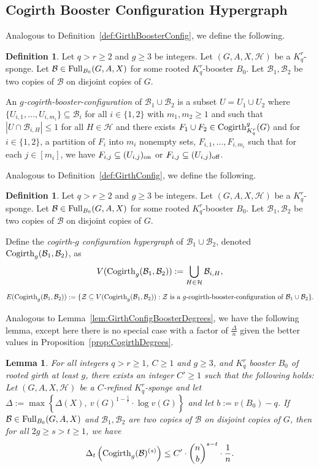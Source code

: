\documentclass[11pt]{article}
\newcommand{\mc}[1]{\mathcal{#1}}
\newcounter{i}
\theoremstyle{plain}
\newtheorem{lem}[thm]{Lemma}
\theoremstyle{plain} %
\theoremstyle{definition}
\newtheorem{definition}[thm]{Definition}
\begin{document}
\subsection{Cogirth Booster Configuration Hypergraph}

Analogous to Definition~\ref{def:GirthBoosterConfig}, we define the following. 

\begin{definition}
Let $q>r\ge 2$ and $g\ge 3$ be integers. Let $(G,A,X,\mc{H})$ be a $K_q^r$-sponge. Let $\mc{B} \in {\rm Full}_{B_0}(G,A,X)$ for some rooted $K_q^r$-booster $B_0$. Let $\mc{B}_1, \mc{B}_2$ be two copies of $\mc{B}$ on disjoint copies of $G$.

An \emph{$g$-cogirth-booster-configuration} of $\mc{B}_1\cup \mc{B}_2$ is a subset $U =U_1\cup U_2$ where $\{U_{i,1},\ldots,U_{i,m_i}\}\subseteq \mc{B}_i$ for all $i\in \{1,2\}$ with $m_1,m_2\ge 1$ and such that $|U\cap \mc{B}_{i,H}|\le 1$ for all $H\in \mc{H}$ and there exists $F_1\cup F_2\in {\rm Cogirth}_{K_q^r}^g(G)$ and for $i\in \{1,2\}$, a partition of $F_i$ into $m_i$ nonempty sets, $F_{i,1},\ldots, F_{i,m_i}$ such that for each $j\in [m_i]$, we have $F_{i,j}\subseteq (U_{i,j})_{\rm on}$ or $F_{i,j}\subseteq (U_{i,j})_{\rm off}$.
\end{definition}

Analogous to Definition~\ref{def:GirthConfig}, we define the following. 

\begin{definition}
Let $q>r\ge 2$ and $g\ge 3$ be integers. Let $(G,A,X,\mc{H})$ be a $K_q^r$-sponge. Let $\mc{B} \in {\rm Full}_{B_0}(G,A,X)$ for some rooted $K_q^r$-booster $B_0$. Let $\mc{B}_1,\mc{B}_2$ be two copies of $\mc{B}$ on disjoint copies of $G$.

Define the \emph{cogirth-$g$ configuration hypergraph} of $\mc{B}_1\cup  \mc{B}_2$, denoted ${\rm Cogirth}_g(\mc{B}_1,\mc{B}_2)$, as
$$V({\rm Cogirth}_g(\mc{B}_1,\mc{B}_2)) := \bigcup_{H\in \mc{H}} \mc{B}_{i,H},$$
$$E({\rm Cogirth}_g(\mc{B}_1,\mc{B}_2)):= \{ \mc{Z}\subseteq V({\rm Cogirth}_g(\mc{B}_1,\mc{B}_2)): \mc{Z} \text{ is a $g$-cogirth-booster-configuration of } \mc{B}_1\cup \mc{B}_2\}.$$
\end{definition}

Analogous to Lemma~\ref{lem:GirthConfigBoosterDegrees}, we have the following lemma, except here there is no special case with a factor of $\frac{\Delta}{n}$ given the better values in Proposition~\ref{prop:CogirthDegrees}.

\begin{lem}\label{lem:CogirthConfigBoosterDegrees}
For all integers $q>r\ge 1$, $C\ge 1$ and $g\ge 3$, and $K_q^r$ booster $B_0$ of rooted girth at least $g$, there exists an integer $C'\ge 1$ such that the following holds: Let $(G,A,X,\mc{H})$ be a $C$-refined $K_q^r$-sponge and let $\Delta := \max\left\{ \Delta(X),~v(G)^{1-\frac{1}{r}}\cdot \log v(G)\right\}$ and let $b:=v(B_0)-q$. If $\mc{B} \in {\rm Full}_{B_0}(G,A,X)$ and $\mc{B}_1,\mc{B}_2$ are two copies of $\mc{B}$ on disjoint copies of $G$, then for all $2g\ge s > t \ge 1$, we have
$$\Delta_{t}\left({\rm Cogirth}_g(\mc{B})^{(s)}\right)\le C'\cdot \binom{n}{b}^{s-t}\cdot \frac{1}{n}.$$  
\end{lem}
\end{document}
